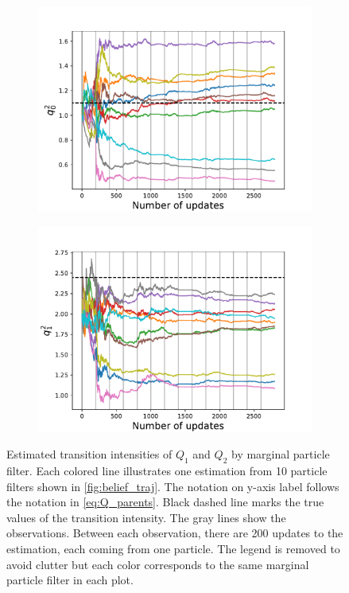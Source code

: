 \begin{figure}[H]
\begin{subfigure}{.5\textwidth}
		\includegraphics[width=1\linewidth]{figures/q_convergence/Q2_01}
		\caption{}
		\label{fig:Q2_01}
	\end{subfigure}
	\begin{subfigure}{.5\textwidth}
		\centering
		\includegraphics[width=1\linewidth]{figures/q_convergence/Q2_10}
		\caption{}
		\label{fig:Q2_10}
	\end{subfigure}
	\caption[Estimation of $ Q_1 $ and $ Q_2 $ by marginal particle filter]{Estimated transition intensities of $ Q_1 $ and $ Q_2 $ by marginal particle filter. Each colored line illustrates one estimation from 10 particle filters shown in \autoref{fig:belief_traj}. The notation on y-axis label follows the notation in \autoref{eq:Q_parents}. Black dashed line marks the true values of the transition intensity. The gray lines show the observations. Between each observation, there are 200 updates to the estimation, each coming from one particle. The legend is removed to avoid clutter but each color corresponds to the same marginal particle filter in each plot.}
	\label{fig:q_convergence}
\end{figure}
